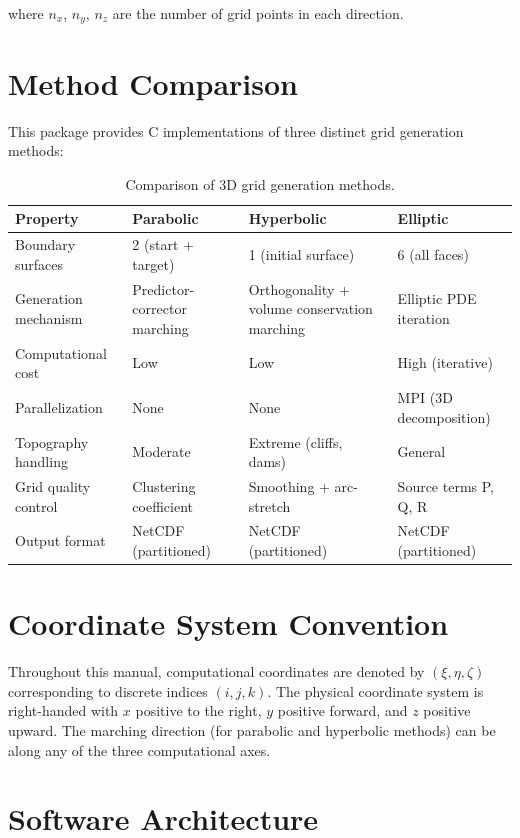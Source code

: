 \documentclass[11pt,a4paper]{report}
\begin{document}
where $n_x$, $n_y$, $n_z$ are the number of grid points in each direction.

\section{Method Comparison}

This package provides C implementations of three distinct grid generation methods:

\begin{table}[H]
\centering
\begin{tabular}{lp{3cm}p{4cm}p{4cm}}
\toprule
\textbf{Property} & \textbf{Parabolic} & \textbf{Hyperbolic} & \textbf{Elliptic} \\
\midrule
Boundary surfaces & 2 (start + target) & 1 (initial surface) & 6 (all faces) \\
Generation mechanism & Predictor-corrector marching & Orthogonality + volume conservation marching & Elliptic PDE iteration \\
Computational cost & Low & Low & High (iterative) \\
Parallelization & None & None & MPI (3D decomposition) \\
Topography handling & Moderate & Extreme (cliffs, dams) & General \\
Grid quality control & Clustering coefficient & Smoothing + arc-stretch & Source terms P, Q, R \\
Output format & NetCDF (partitioned) & NetCDF (partitioned) & NetCDF (partitioned) \\
\bottomrule
\end{tabular}
\caption{Comparison of 3D grid generation methods.}
\end{table}

\section{Coordinate System Convention}

Throughout this manual, computational coordinates are denoted by $(\xi, \eta, \zeta)$ corresponding to discrete indices $(i, j, k)$. The physical coordinate system is right-handed with $x$ positive to the right, $y$ positive forward, and $z$ positive upward. The marching direction (for parabolic and hyperbolic methods) can be along any of the three computational axes.

\section{Software Architecture}
\end{document}
